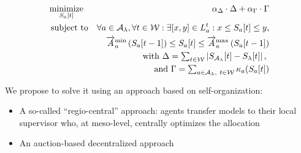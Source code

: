 \documentclass[conference]{IEEEtran}
\begin{document}
\begin{eqnarray}
\label{eq:csop-scheduling-hierarchy} \textstyle
		& \underset{\AgentPower{t}{\AnAgent}}{\operatorname{minimize}} & 
		\alpha_{\ViolationObjective} \cdot \ViolationObjective + \alpha_{\CostsObjective} \cdot \CostsObjective \\
		& \operatorname{subject\ to} & \forall a \in \Subsystem, \forall t \in \Horizon : \exists [x , y] \in \ListProduction{t}\AnAgent : x \leq \AgentPower{t}{\AnAgent} \leq y\text{,} \nonumber \\
		& & \ChangeSpeedMin\AnAgent \left(\AgentPower{t-1}\AnAgent\right) \leq \AgentPower{t}{\AnAgent} \leq \ChangeSpeedMax\AnAgent\left(\AgentPower{t-1}\AnAgent\right) \nonumber\\
		& & \textstyle \text{with } \ViolationObjective = \sum_{t \in \Horizon} \left|\Production_\Subsystem[t] - \AssResidualLoad{t}{\AnAvpp} \right| \text{, } \nonumber \\
		& & \textstyle \text{and } 
		\CostsObjective = \sum_{a \in \Subsystem,\ t \in \Horizon} \CostFunction\AnAgent{\AgentPower{t}{\AnAgent}} \nonumber
\end{eqnarray}

We propose to solve it using an approach based on self-organization:
\begin{itemize}
\item A so-called ``regio-central'' approach: agents transfer models to their local supervisor who, at meso-level,
centrally optimizes the allocation~\cite{Schiendorfer2014, SchiendorferSyn2014}
\item An auction-based decentralized approach~\cite{Anders-TAAS-2015}
\end{itemize}
\end{document}
